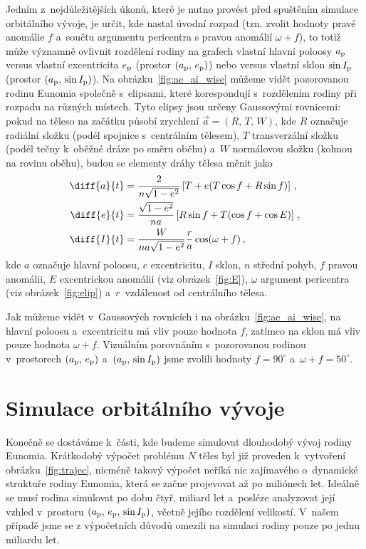 \documentclass[A4paper, 12pt, oneside]{book}
\begin{document}
Jedním z~nejdůležitějších úkonů, které je nutno provést před spuštěním simulace orbitálního vývoje, je určit, kde nastal úvodní rozpad (tzn. zvolit hodnoty pravé anomálie $f$ a~součtu argumentu pericentra s pravou anomálií $\omega+f$), to totiž může významně ovlivnit rozdělení rodiny na grafech vlastní hlavní poloosy $a_{\rm p}$ versus vlastní excentricita $e_{\rm p}$ (prostor $(a_{\rm p},\,e_{\rm p})$) nebo versus vlastní sklon $\sin I_{\rm p}$ (prostor $(a_{\rm p},\,\sin I_{\rm p})$). Na obrázku~\ref{fig:ae_ai_wise} můžeme vidět pozorovanou rodinu Eunomia společně s~elipsami, které korespondují s~rozdělením rodiny při rozpadu na různých místech. Tyto elipsy jsou určeny Gaussovými rovnicemi: pokud na těleso na začátku působí zrychlení $\vec{a}=(R,\,T,\,W)$, kde $R$ označuje radiální složku (podél spojnice s~centrálním tělesem), $T$ transverzální složku (podél tečny k~oběžné dráze po směru oběhu) a~$W$ normálovou složku (kolmou na rovinu oběhu), budou se elementy dráhy tělesa měnit jako~\cite{fmt}
\begin{align}
	\diff{a}{t}&=\frac{2}{n\sqrt{1-e^2}}\left[T+e(T\cos f+R\sin f)\right] \,, \\
	\diff{e}{t}&=\frac{\sqrt{1-e^2}}{na}\left[R\sin f+T(\cos f+\cos E)\right]\,, \\
	\diff{I}{t}&=\frac{W}{na\sqrt{1-e^2}}\frac{r}{a}\cos(\omega+f)\,,
\end{align}
kde $a$ označuje hlavní poloosu, $e$ excentricitu, $I$ sklon, $n$ střední pohyb, $f$ pravou anomálii, $E$ excentrickou anomálii (viz obrázek~\ref{fig:E}), $\omega$ argument pericentra (viz obrázek~\ref{fig:elip}) a~$r$~vzdálenost od centrálního tělesa.

Jak můžeme vidět v~Gaussových rovnicích i na obrázku~\ref{fig:ae_ai_wise}, na hlavní poloosu a~excentricitu má vliv pouze hodnota $f$, zatímco na sklon má vliv pouze hodnota $\omega+f$. Vizuálním porovnáním s~pozorovanou rodinou v~prostorech $(a_{\rm p},\,e_{\rm p})$ a~$(a_{\rm p},\,\sin I_{\rm p})$ jsme zvolili hodnoty $f=90^\circ$ a~$\omega+f=50^\circ$.
\section{Simulace orbitálního vývoje}

Konečně se dostáváme k~části, kde budeme simulovat dlouhodobý vývoj rodiny Eunomia. Krátkodobý výpočet problému $N$ těles byl již proveden k~vytvoření obrázku~\ref{fig:trajec}, nicméně takový výpočet neříká nic zajímavého o~dynamické struktuře rodiny Eunomia, která se začne projevovat až po miliónech let. Ideálně se musí rodina simulovat po dobu čtyř, miliard let a~posléze analyzovat její vzhled v~prostoru $(a_{\rm p},\,e_{\rm p},\,\sin I_{\rm p})$, včetně jejího rozdělení velikostí. V~našem případě jsme se z výpočetních důvodů omezili na simulaci rodiny pouze po jednu miliardu let.
\end{document}
